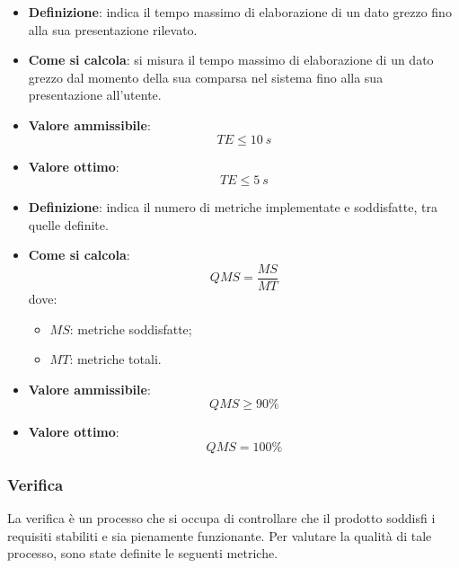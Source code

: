 \hypertarget{24M}{}
\begin{itemize}
	\item \textbf{Definizione}: indica il tempo massimo di elaborazione di un dato grezzo fino alla sua presentazione rilevato.
	\item \textbf{Come si calcola}: si misura il tempo massimo di elaborazione di un dato grezzo dal momento della sua comparsa nel sistema fino alla sua presentazione all'utente.
	\item \textbf{Valore ammissibile}: \begin{equation*}TE \leq 10\ s\end{equation*}
	\item \textbf{Valore ottimo}: \begin{equation*}TE \leq 5\ s\end{equation*}
\end{itemize}

\hypertarget{25M}{}
\begin{itemize}
	\item \textbf{Definizione}: indica il numero di metriche implementate e soddisfatte, tra quelle definite.
	\item \textbf{Come si calcola}: \begin{equation*}QMS = \frac{MS}{MT}\end{equation*} dove:
		\begin{itemize}
			\item $MS$: metriche soddisfatte;
			\item $MT$: metriche totali.
		\end{itemize}
	\item \textbf{Valore ammissibile}: \begin{equation*}QMS \geq 90\%\end{equation*}
	\item \textbf{Valore ottimo}: \begin{equation*}QMS = 100\%\end{equation*}
\end{itemize}

\subsubsection{Verifica}
La verifica è un processo che si occupa di controllare che il prodotto soddisfi i requisiti stabiliti
e sia pienamente funzionante. Per valutare la qualità di tale processo, sono state definite le seguenti metriche.

